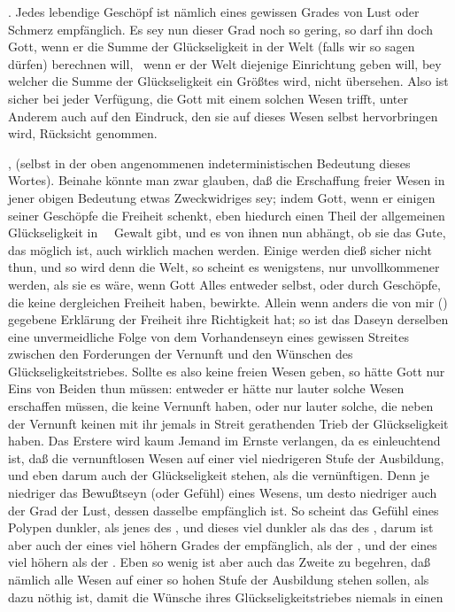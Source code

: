 \begin{aufza}
\item {}. Jedes lebendige Geschöpf ist nämlich eines gewissen Grades von Lust oder Schmerz empfänglich. Es sey nun dieser Grad noch so gering, so darf ihn doch Gott, wenn er die Summe der Glückseligkeit in der Welt (falls wir so sagen dürfen) berechnen will, \dh\ wenn er der Welt diejenige Einrichtung geben will, bey welcher die Summe der Glückseligkeit ein Größtes wird, nicht übersehen. Also ist sicher bei jeder Verfügung, die Gott mit einem solchen Wesen trifft, unter Anderem auch auf den Eindruck, den sie auf dieses Wesen selbst hervorbringen wird, Rücksicht genommen.
\item {}, (selbst in der oben angenommenen indeterministischen Bedeutung dieses Wortes). Beinahe könnte man zwar glauben, daß die Erschaffung freier Wesen in jener obigen Bedeutung etwas Zweckwidriges sey; indem Gott, wenn er einigen seiner Geschöpfe die Freiheit schenkt, eben hiedurch einen Theil der allgemeinen Glückseligkeit in ~\ Gewalt gibt, und es von ihnen nun abhängt, ob sie das Gute, das möglich ist, auch wirklich machen werden. Einige werden dieß sicher nicht thun, und so wird denn die Welt, so scheint es wenigstens, nur unvollkommener werden, als sie es wäre, wenn Gott Alles entweder selbst, oder durch Geschöpfe, die keine dergleichen Freiheit haben, bewirkte. Allein wenn anders die von mir () gegebene Erklärung der Freiheit ihre Richtigkeit hat; so ist das Daseyn derselben eine unvermeidliche Folge von dem Vorhandenseyn eines gewissen Streites zwischen den Forderungen der Vernunft und den Wünschen des Glückseligkeitstriebes. Sollte es also keine freien Wesen geben, so hätte Gott nur Eins von Beiden thun müssen: entweder er hätte nur lauter solche Wesen erschaffen müssen, die keine Vernunft haben, oder nur lauter solche, die neben der Vernunft keinen mit ihr jemals in Streit gerathenden Trieb der Glückseligkeit haben. Das Erstere wird kaum Jemand im Ernste verlangen, da es einleuchtend ist, daß die vernunftlosen Wesen auf einer viel niedrigeren Stufe der Ausbildung, und eben darum auch der Glückseligkeit stehen, als die vernünftigen. Denn je niedriger das Bewußtseyn (oder Gefühl) eines Wesens, um desto niedriger auch der Grad der Lust, dessen dasselbe empfänglich ist. So scheint das Gefühl eines Polypen dunkler, als jenes des , und dieses viel dunkler als das des , darum ist aber auch der  eines viel höhern Grades der  empfänglich, als der , und der  eines viel höhern als der . Eben so wenig ist aber auch das Zweite zu begehren, daß nämlich alle Wesen auf einer so hohen Stufe der Ausbildung stehen sollen, als dazu nöthig ist, damit die Wünsche ihres Glückseligkeitstriebes niemals in einen 
\end{aufza}
